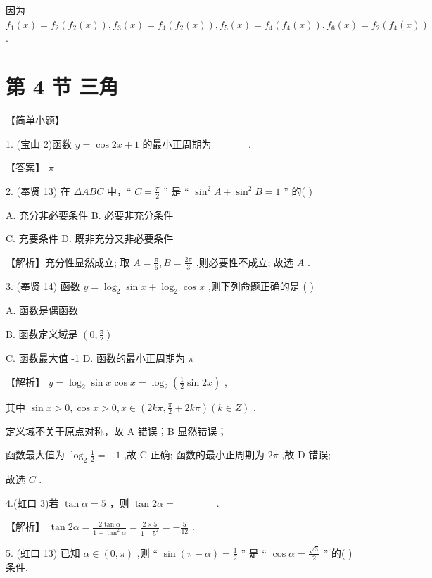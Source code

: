 \documentclass[10pt]{article}
\begin{document}
因为 \({f}_{1}\left( x\right)  = {f}_{2}\left( {{f}_{2}\left( x\right) }\right) ,{f}_{3}\left( x\right)  = {f}_{4}\left( {{f}_{2}\left( x\right) }\right) ,{f}_{5}\left( x\right)  = {f}_{4}\left( {{f}_{4}\left( x\right) }\right) ,{f}_{6}\left( x\right)  = {f}_{2}\left( {{f}_{4}\left( x\right) }\right)\) .

\section*{第 4 节 三角}

【简单小题】

1. (宝山 2)函数 \(y = \cos {2x} + 1\) 的最小正周期为\_\_\_\_\_.

【答案】 \(\pi\)

2. (奉贤 13) 在 \({\Delta ABC}\) 中，“ \(C = \frac{\pi }{2}\) ” 是 “ \({\sin }^{2}A + {\sin }^{2}B = 1\) ” 的( )

A. 充分非必要条件 B. 必要非充分条件

C. 充要条件 D. 既非充分又非必要条件

【解析】充分性显然成立; 取 \(A = \frac{\pi }{6},B = \frac{2\pi }{3}\) ,则必要性不成立; 故选 \(A\) .

3. (奉贤 14) 函数 \(y = {\log }_{2}\sin x + {\log }_{2}\cos x\) ,则下列命题正确的是 ( )

A. 函数是偶函数

B. 函数定义域是 \(\left( {0,\frac{\pi }{2}}\right)\)

C. 函数最大值 -1 D. 函数的最小正周期为 \(\pi\)

【解析】 \(y = {\log }_{2}\sin x\cos x = {\log }_{2}\left( {\frac{1}{2}\sin {2x}}\right)\) ,

其中 \(\sin x > 0,\cos x > 0,x \in  \left( {{2k\pi },\frac{\pi }{2} + {2k\pi }}\right) \left( {k \in  Z}\right)\) ,

定义域不关于原点对称，故 A 错误；B 显然错误；

函数最大值为 \({\log }_{2}\frac{1}{2} =  - 1\) ,故 \(\mathrm{C}\) 正确; 函数的最小正周期为 \({2\pi }\) ,故 \(\mathrm{D}\) 错误;

故选 \(C\) .

4.(虹口 3)若 \(\tan \alpha  = 5\) ，则 \(\tan {2\alpha } =\) \_\_\_\_\_.

【解析】 \(\tan {2\alpha } = \frac{2\tan \alpha }{1 - {\tan }^{2}\alpha } = \frac{2 \times  5}{1 - {5}^{2}} =  - \frac{5}{12}\) .

5. (虹口 13) 已知 \(\alpha  \in  \left( {0,\pi }\right)\) ,则 “ \(\sin \left( {\pi  - \alpha }\right)  = \frac{1}{2}\) ” 是 “ \(\cos \alpha  = \frac{\sqrt{3}}{2}\) ” 的(   )条件.
\end{document}
